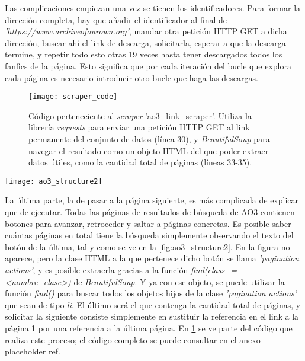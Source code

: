 \documentclass{pre-tfg}
\newcommand{\refToLinkScraperCode}{placeholder ref}
\begin{document}
Las complicaciones empiezan una vez se tienen los identificadores. Para formar la dirección completa, hay que añadir el identificador al final de \textit{'https://www.archiveofourown.org'}, mandar otra petición HTTP GET a dicha dirección, buscar ahí el link de descarga, solicitarla, esperar a que la descarga termine, y repetir todo esto otras 19 veces hasta tener descargados todos los fanfics de la página. Esto significa que por cada iteración del bucle que explora cada página es necesario introducir otro bucle que haga las descargas.

\begin{figure}
	\label{code:scraper1}
	\texttt{[image: scraper\_code]}
	\caption{Código perteneciente al \textit{scraper} 'ao3\_link\_scraper'. Utiliza la librería \textit{requests} para enviar una petición HTTP GET al link permanente del conjunto de datos (línea 30), y \textit{BeautifulSoup} para navegar el resultado como un objeto HTML del que poder extraer datos útiles, como la cantidad total de páginas (líneas 33-35).}
	\centering
\end{figure}

\begin{SCfigure}
	\label{fig:ao3_structure2}
	\caption{Navegación de páginas de búsqueda de AO3. Todos los botones vienen con su número de página, y se puede ver cuál es la última}
	\texttt{[image: ao3\_structure2]}
\end{SCfigure}

La última parte, la de pasar a la página siguiente, es más complicada de explicar que de ejecutar. Todas las páginas de resultados de búsqueda de AO3 contienen botones para avanzar, retroceder y saltar a páginas concretas. Es posible saber cuántas páginas en total tiene la búsqueda simplemente observando el texto del botón de la última, tal y como se ve en la \ref{fig:ao3_structure2}. En la figura no aparece, pero la clase HTML a la que pertenece dicho botón se llama \textit{'pagination actions'}, y es posible extraerla gracias a la función \textit{find(class\_=<nombre\_clase>)} de \textit{BeautifulSoup}. Y ya con ese objeto, se puede utilizar la función \textit{find()} para buscar todos los objetos hijos de la clase \textit{'pagination actions'} que sean de tipo \textit{li}. El último será el que contenga la cantidad total de páginas, y solicitar la siguiente consiste simplemente en sustituir la referencia en el link a la página 1 por una referencia a la última página. En \ref{code:scraper1} se ve parte del código que realiza este proceso; el código completo se puede consultar en el anexo \refToLinkScraperCode.
\end{document}
